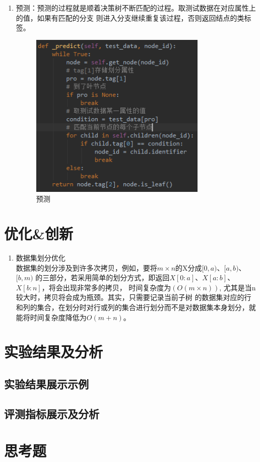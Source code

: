 \documentclass[UTF8,a4paper,12pt]{article}
\begin{document}
\begin{enumerate}[itemindent=0.5em,label=\arabic*、]
\begin{figure}[h]
  \end{figure}
  \item 预测：预测的过程就是顺着决策树不断匹配的过程。取测试数据在对应属性上的值，如果有匹配的分支
  则进入分支继续重复该过程，否则返回结点的类标签。
  \begin{figure}[h]
  \begin{center}
  \includegraphics[width=0.8\textwidth]{p6.png} %
  \caption{预测}
  \end{center}
  \end{figure}
\end{enumerate}

\section{优化\&创新}
\begin{enumerate}[itemindent=0.5em,label=\arabic*、]
  \item 数据集划分优化\\
  数据集的划分涉及到许多次拷贝，例如，要将$m \times n$的X分成$[0, a)$、$[a, b)$、$[b, m)$
  的三部分，若采用简单的划分方式，即返回$X[0:a]$、$X[a:b]$、$X[b:n]$，将会出现非常多的拷贝，
  时间复杂度为$(O(m \times n))$, 尤其是当n较大时，拷贝将会成为瓶颈。其实，只需要记录当前子树
  的数据集对应的行和列的集合，在划分时对行或列的集合进行划分而不是对数据集本身划分，就能将时间复杂度降低为$O(m + n)$。
\end{enumerate}
\section{实验结果及分析}
\subsection{实验结果展示示例}
\subsection{评测指标展示及分析}

\section{思考题}
\end{document}
